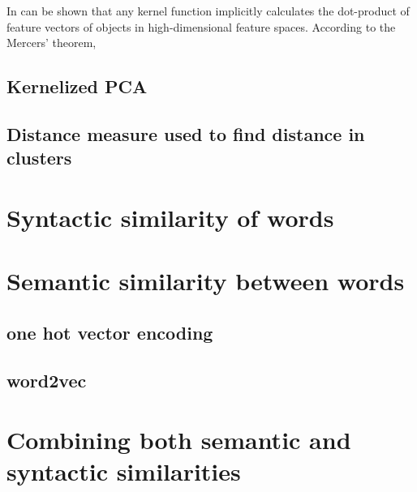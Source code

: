 In can be shown that any kernel function implicitly calculates the dot-product of feature vectors of objects in high-dimensional feature spaces.
According to the Mercers' theorem, 

\cite{Scholkopf:2001:LKS:559923}
\subsection{Kernelized PCA}

\subsection{Distance measure used to find distance in clusters}
 
\section{Syntactic similarity of words}
\section{Semantic similarity between words}
\subsection{one hot vector encoding}
\subsection{word2vec}
\section{Combining both semantic and syntactic similarities}

